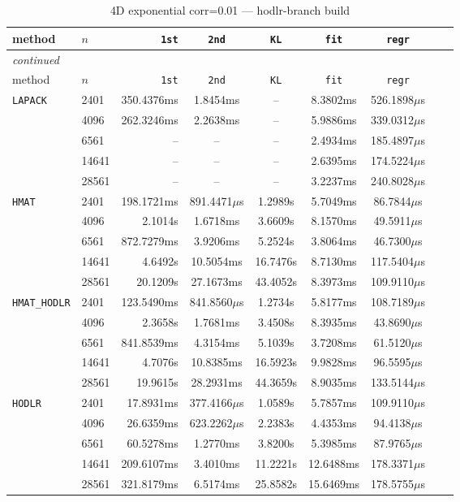 \documentclass[11pt,a4paper]{article}
\begin{document}
\begin{center}
\begin{longtable}{llrcccccc}
\caption{4D exponential corr=0.01 --- hodlr-branch build}
\\\toprule
method & $n$ & \texttt{1st} & \texttt{2nd} & \texttt{KL} & \texttt{fit} & \texttt{regr}\\
\midrule
\endfirsthead
\multicolumn{8}{l}{\small\emph{continued}}\\
\toprule
method & $n$ & \texttt{1st} & \texttt{2nd} & \texttt{KL} & \texttt{fit} & \texttt{regr}\\
\midrule
\endhead

\texttt{LAPACK} & 2401 & 350.4376ms & 1.8454ms & -- & 8.3802ms & 526.1898$\mu$s\\
 & 4096 & 262.3246ms & 2.2638ms & -- & 5.9886ms & 339.0312$\mu$s\\
 & 6561 & -- & -- & -- & 2.4934ms & 185.4897$\mu$s\\
 & 14641 & -- & -- & -- & 2.6395ms & 174.5224$\mu$s\\
 & 28561 & -- & -- & -- & 3.2237ms & 240.8028$\mu$s\\
\texttt{HMAT} & 2401 & 198.1721ms & 891.4471$\mu$s & 1.2989s & 5.7049ms & 86.7844$\mu$s\\
 & 4096 & 2.1014s & 1.6718ms & 3.6609s & 8.1570ms & 49.5911$\mu$s\\
 & 6561 & 872.7279ms & 3.9206ms & 5.2524s & 3.8064ms & 46.7300$\mu$s\\
 & 14641 & 4.6492s & 10.5054ms & 16.7476s & 8.7130ms & 117.5404$\mu$s\\
 & 28561 & 20.1209s & 27.1673ms & 43.4052s & 8.3973ms & 109.9110$\mu$s\\
\texttt{HMAT\_HODLR} & 2401 & 123.5490ms & 841.8560$\mu$s & 1.2734s & 5.8177ms & 108.7189$\mu$s\\
 & 4096 & 2.3658s & 1.7681ms & 3.4508s & 8.3935ms & 43.8690$\mu$s\\
 & 6561 & 841.8539ms & 4.3154ms & 5.1039s & 3.7208ms & 61.5120$\mu$s\\
 & 14641 & 4.7076s & 10.8385ms & 16.5923s & 9.9828ms & 96.5595$\mu$s\\
 & 28561 & 19.9615s & 28.2931ms & 44.3659s & 8.9035ms & 133.5144$\mu$s\\
\texttt{HODLR} & 2401 & 17.8931ms & 377.4166$\mu$s & 1.0589s & 5.7857ms & 109.9110$\mu$s\\
 & 4096 & 26.6359ms & 623.2262$\mu$s & 2.2383s & 4.4353ms & 94.4138$\mu$s\\
 & 6561 & 60.5278ms & 1.2770ms & 3.8200s & 5.3985ms & 87.9765$\mu$s\\
 & 14641 & 209.6107ms & 3.4010ms & 11.2221s & 12.6488ms & 178.3371$\mu$s\\
 & 28561 & 321.8179ms & 6.5174ms & 25.8582s & 15.6469ms & 178.5755$\mu$s\\
\bottomrule\end{longtable}\end{center}
\end{document}
